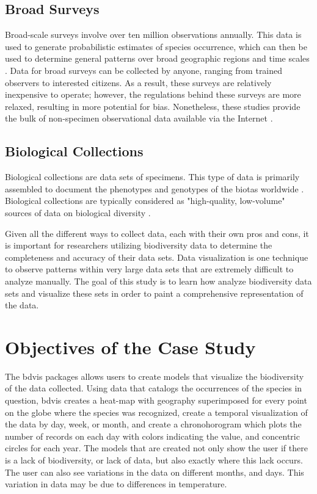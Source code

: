 \subsection{Broad  Surveys}

Broad-scale surveys involve over ten million observations annually.
This data is used to generate probabilistic estimates of species occurrence, which can then be used to determine general patterns over broad geographic regions and time scales \cite {GBIFbirds}.
Data for broad surveys can be collected by anyone, ranging from trained observers to interested citizens.
As a result, these surveys are relatively inexpensive to operate; however, the regulations behind these surveys are more relaxed, resulting in more potential for bias.
Nonetheless, these studies provide the bulk of non-specimen observational data available via the Internet \cite {SP}.

\subsection{Biological Collections}

Biological collections are data sets of specimens.
This type of data is primarily assembled to document the phenotypes and genotypes of the biotas worldwide \cite{Barve}.
Biological collections are typically considered as "high-quality, low-volume" sources of data on biological diversity \cite{Barve}.

Given all the different ways to collect data, each with their own pros and cons, it is important for researchers utilizing biodiversity data to determine the completeness and accuracy of their data sets.
Data visualization is one technique to observe patterns within very large data sets that are extremely difficult to analyze manually.
The goal of this study is to learn how analyze biodiversity data sets and visualize these sets in order to paint a comprehensive representation of the data.

\section{Objectives of the Case Study}

The bdvis packages allows users to create models that visualize the biodiversity of the data collected.
Using data that catalogs the occurrences of the species in question, bdvis creates a  heat-map with geography superimposed for every point on the globe where the species was recognized, create a temporal visualization of the data by day, week, or month, and create a chronohorogram which plots the number of records on each day with colors indicating the value, and concentric circles for each year.
The models that are created not only show the user if there is a lack of biodiversity, or lack of data, but also exactly where this lack occurs.
The user can also see variations in the data on different months, and days.
This variation in data may be due to differences in temperature.

